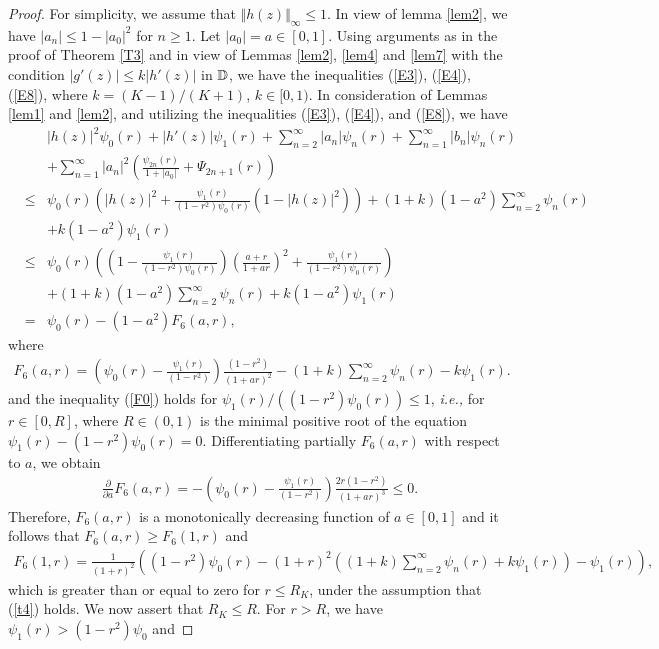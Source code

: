 \documentclass[11pt,reqno]{amsart}
\newtheorem{open problem}{Open problem}[section]
\newcommand{\D}{{\Bbb{D}}}
\newcommand{\pa}{\partial}
\newcommand{\beas}{\begin{eqnarray*}}
\newcommand{\eeas}{\end{eqnarray*}}
\newcommand{\bea}{\begin{eqnarray}}
\newcommand{\eea}{\end{eqnarray}}
\numberwithin{equation}{section}
\begin{document}
\begin{proof}
For simplicity, we assume that $\Vert h(z)\Vert_\infty\leq 1$. In view of \textrm{lemma \ref{lem2}}, we have $|a_n|\leq 1-|a_0|^2$ 
for $n\geq 1$. Let $|a_0|=a\in[0,1]$.
Using arguments as in the proof of \textrm{Theorem \ref{T3}} and in view of \textrm{Lemmas \ref{lem2}}, \ref{lem4} and \ref{lem7} with the condition $|g'(z)|\leq k|h'(z)|$ in 
$\D$, we have the inequalities (\ref{E3}), (\ref{E4}), (\ref{E8}), where $k= (K-1)/(K+1)$, $k\in[0,1)$.
In consideration of \textrm{Lemmas \ref{lem1}} and \ref{lem2}, and utilizing the inequalities (\ref{E3}), (\ref{E4}), and (\ref{E8}), we have 
\bea &&|h(z)|^2\psi_0(r)+|h'(z)|\psi_1(r)+\sum_{n=2}^\infty |a_n| \psi_n(r)+\sum_{n=1}^\infty |b_n| \psi_n(r)\nonumber\\[2mm]
&&+\sum_{n=1}^\infty |a_n|^2\left(\frac{\psi_{2n}(r)}{1+|a_0|}+\Psi_{2n+1}(r)\right)\nonumber\\[2mm]
&\leq&\psi_0(r)\left(|h(z)|^2+\frac{\psi_1(r)}{\left(1-r^2\right)\psi_0(r)}\left(1-|h(z)|^2\right)\right)+(1+k)\left(1-a^2\right)\sum_{n=2}^\infty \psi_n(r)\nonumber\\[2mm]
&&+k\left(1-a^2\right)\psi_1(r)\nonumber\\[2mm]
\label{F0}&\leq&\psi_0(r)\left(\left(1-\frac{\psi_1(r)}{\left(1-r^2\right)\psi_0(r)}\right)\left(\frac{a+r}{1+ar}\right)^2+\frac{\psi_1(r)}{\left(1-r^2\right)\psi_0(r)}\right)\\[2mm]
&&+(1+k)\left(1-a^2\right)\sum_{n=2}^\infty \psi_n(r)+k\left(1-a^2\right)\psi_1(r)\nonumber\\[2mm]
&=&\psi_0(r)-\left(1-a^2\right)F_6(a,r),\nonumber\eea
where 
\beas F_6(a,r)=\left(\psi_0(r)-\frac{\psi_1(r)}{\left(1-r^2\right)}\right)\frac{\left(1-r^2\right)}{(1+ar)^2}-(1+k)\sum_{n=2}^\infty \psi_n(r)-k\psi_1(r).\eeas
and the inequality (\ref{F0}) holds for $\psi_1(r)/\left(\left(1-r^2\right)\psi_0(r)\right)\leq 1$, {\it i.e.,} for $r\in[0,R]$, where $R\in(0,1)$ is the minimal positive root of the equation $\psi_1(r)-\left(1-r^2\right)\psi_0(r)=0$.
Differentiating partially $F_6(a,r)$ with respect to $a$, we obtain 
\beas\frac{\pa}{\pa a}F_6(a,r)=-\left(\psi_0(r)-\frac{\psi_1(r)}{\left(1-r^2\right)}\right)\frac{2r\left(1-r^2\right)}{(1+ar)^3}\leq 0.\eeas
Therefore, $F_6(a,r)$ is a monotonically decreasing function of $a\in[0, 1]$ and it follows that $F_6(a,r)\geq F_6(1,r)$ and
\beas F_6(1,r)=\frac{1}{(1+r)^2}\left(\left(1-r^2\right)\psi_0(r)-(1+r)^2\left((1+k)\sum_{n=2}^\infty \psi_n(r)+k\psi_1(r)\right)-\psi_1(r)\right),\eeas
which is greater than or equal to zero for $r\leq R_K$, under the assumption that (\ref{t4}) holds. We now assert that $R_K\leq R$. For $r>R$, we have $\psi_1(r)>\left(1-r^2\right)\psi_0$ and

\end{proof}
\end{document}
